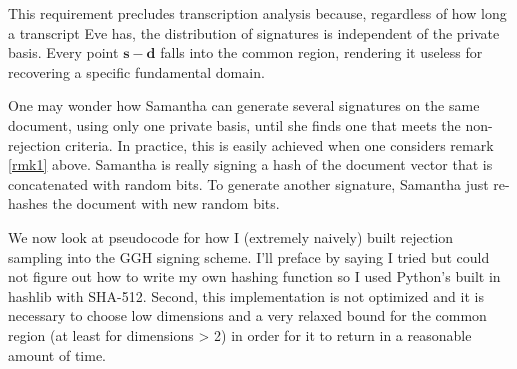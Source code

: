 \documentclass[11pt,reqno]{amsart}
\theoremstyle{definition}
\begin{document}
\vspace{\baselineskip}
This requirement precludes transcription analysis because, regardless of how long a transcript Eve has, the distribution of signatures is independent of the private basis. Every point $\mathbf{s} - \mathbf{d}$ falls into the common region, rendering it useless for recovering a specific fundamental domain. 

One may wonder how Samantha can generate several signatures on the same document, using only one private basis, until she finds one that meets the non-rejection criteria. In practice, this is easily achieved when one considers remark \ref{rmk1} above. Samantha is really signing a hash of the document vector that is concatenated with random bits. To generate another signature, Samantha just re-hashes the document with new random bits. 


\vspace{\baselineskip}
We now look at pseudocode for how I (extremely naively) built rejection sampling into the GGH signing scheme. I'll preface by saying I tried but could not figure out how to write my own hashing function so I used Python's built in hashlib with SHA-512. Second, this implementation is not optimized and it is necessary to choose low dimensions and a very relaxed bound for the common region (at least for dimensions > 2) in order for it to return in a reasonable amount of time. 
\end{document}

